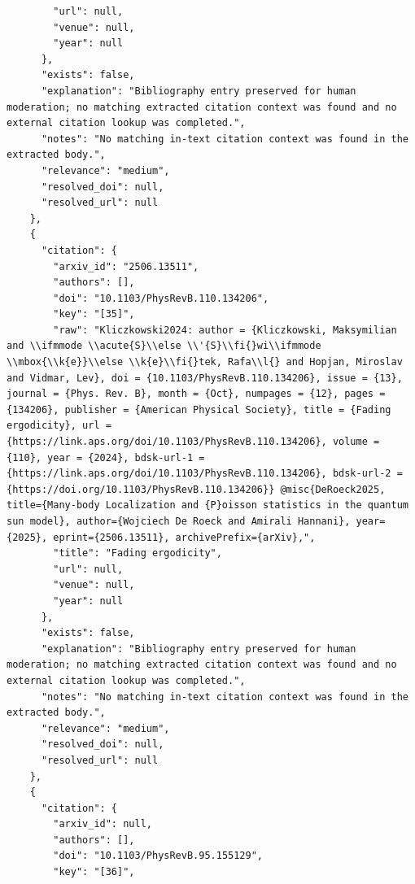\documentclass[11pt]{article}
\begin{document}
\begin{verbatim}
        "url": null,
        "venue": null,
        "year": null
      },
      "exists": false,
      "explanation": "Bibliography entry preserved for human moderation; no matching extracted citation context was found and no external citation lookup was completed.",
      "notes": "No matching in-text citation context was found in the extracted body.",
      "relevance": "medium",
      "resolved_doi": null,
      "resolved_url": null
    },
    {
      "citation": {
        "arxiv_id": "2506.13511",
        "authors": [],
        "doi": "10.1103/PhysRevB.110.134206",
        "key": "[35]",
        "raw": "Kliczkowski2024: author = {Kliczkowski, Maksymilian and \\ifmmode \\acute{S}\\else \\'{S}\\fi{}wi\\ifmmode \\mbox{\\k{e}}\\else \\k{e}\\fi{}tek, Rafa\\l{} and Hopjan, Miroslav and Vidmar, Lev}, doi = {10.1103/PhysRevB.110.134206}, issue = {13}, journal = {Phys. Rev. B}, month = {Oct}, numpages = {12}, pages = {134206}, publisher = {American Physical Society}, title = {Fading ergodicity}, url = {https://link.aps.org/doi/10.1103/PhysRevB.110.134206}, volume = {110}, year = {2024}, bdsk-url-1 = {https://link.aps.org/doi/10.1103/PhysRevB.110.134206}, bdsk-url-2 = {https://doi.org/10.1103/PhysRevB.110.134206}} @misc{DeRoeck2025, title={Many-body Localization and {P}oisson statistics in the quantum sun model}, author={Wojciech De Roeck and Amirali Hannani}, year={2025}, eprint={2506.13511}, archivePrefix={arXiv},",
        "title": "Fading ergodicity",
        "url": null,
        "venue": null,
        "year": null
      },
      "exists": false,
      "explanation": "Bibliography entry preserved for human moderation; no matching extracted citation context was found and no external citation lookup was completed.",
      "notes": "No matching in-text citation context was found in the extracted body.",
      "relevance": "medium",
      "resolved_doi": null,
      "resolved_url": null
    },
    {
      "citation": {
        "arxiv_id": null,
        "authors": [],
        "doi": "10.1103/PhysRevB.95.155129",
        "key": "[36]",

\end{verbatim}
\end{document}
